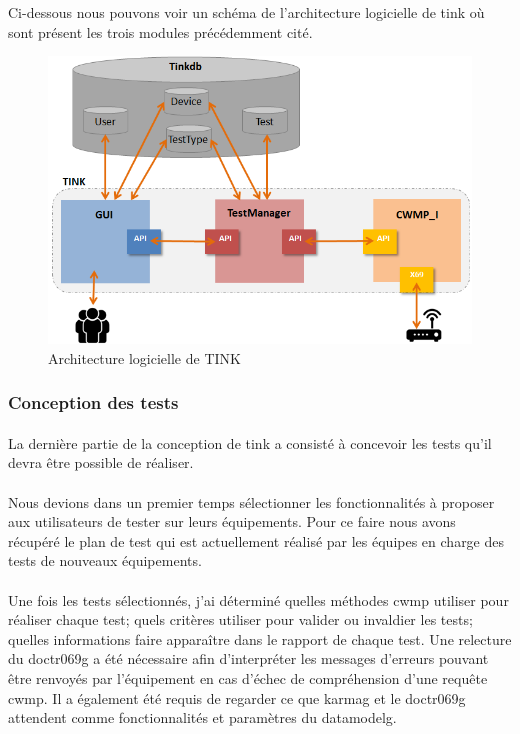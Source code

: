 \documentclass[12pt,a4paper]{report}
\begin{document}
Ci-dessous nous pouvons voir un schéma de l'architecture logicielle de \gls{tink} où sont présent les trois modules précédemment cité.
\begin{figure}[!ht]
    \center
    \includegraphics[scale=0.87]{./img/archi_logi.png}
    \caption{Architecture logicielle de TINK}
\end{figure}
\newpage

\subsubsection{Conception des tests}
\paragraph*{}La dernière partie de la conception de \gls{tink} a consisté à concevoir les tests qu'il devra être possible de réaliser. 
\paragraph*{}Nous devions dans un premier temps sélectionner les fonctionnalités à proposer aux utilisateurs de tester sur leurs équipements. Pour ce faire nous avons récupéré le plan de test qui est actuellement réalisé par les équipes en charge des tests de nouveaux équipements.   
\paragraph*{}Une fois les tests sélectionnés, j'ai déterminé quelles méthodes \gls{cwmp} utiliser pour réaliser chaque test; quels critères utiliser pour valider ou invaldier les tests; quelles informations faire apparaître dans le rapport de chaque test. Une relecture du \gls{doctr069g} a été nécessaire afin d'interpréter les messages d'erreurs pouvant être renvoyés par l'équipement en cas d'échec de compréhension d'une requête \gls{cwmp}. Il a également été requis de regarder ce que \gls{karmag} et le \gls{doctr069g} attendent comme fonctionnalités et paramètres du \gls{datamodelg}.
\end{document}
